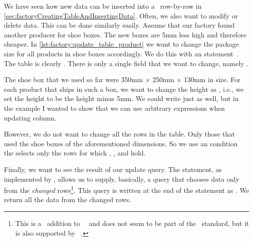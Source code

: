 %
%
%
We have seen how new data can be inserted into a \db\ row-by-row in \cref{sec:factoryCreatingTableAndInsertingData}.
Often, we also want to modify or delete data.
This can be done similarly easily.
%
%
Assume that our factory found another producer for shoe boxes.
The new boxes are 5mm less high and therefore cheaper.
In \cref{lst:factory:update_table_product} we want to change the package size for all products in shoe boxes accordingly.
We do this with an  statement~\cite{PGDG:PD:U}.%
%
%
%
%
%
%
%
%
%
The table is clearly .
There is only a single field that we want to change, namely .

The shoe box that we used so far were 350mm $\times$ 250mm $\times$ 130mm in size.
For each product that ships in such a box, we want to change the height as , i.e., we set the  height to be the  height minus 5mm.
We could write  just as well, but in the example I wanted to show that we can use arbitrary expressions when updating column.

However, we do not want to change all the rows in the table.
Only those that used the shoe boxes of the aforementioned dimensions.
So we use an  condition the selects only the rows for which , , and  hold.

Finally, we want to see the result of our update query.
The  statement, as implemented by \postgresql, allows us to supply, basically, a  query that chooses data only from the \emph{changed} rows\footnote{This is a \postgresql\ addition to~\sql~\cite{SE:DA:2020WDSSOAOTNPSDIOR} and does not seem to be part of the \sql\ standard, but it is also supported by \sqlite~\cite{HWACIS:R}.}.
This query is written at the end of the statement as .
We return all the data from the changed rows.

